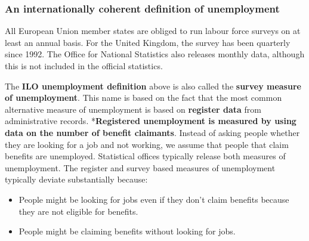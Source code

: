 \documentclass[
]{book}
\providecommand{\tightlist}{%
  \setlength{\itemsep}{0pt}\setlength{\parskip}{0pt}}
\begin{document}
\hypertarget{an-internationally-coherent-definition-of-unemployment}{%
\subsubsection*{An internationally coherent definition of unemployment}\label{an-internationally-coherent-definition-of-unemployment}}

All European Union member states are obliged to run labour force surveys on at least an annual basis. For the United Kingdom, the survey has been quarterly since 1992. The Office for National Statistics also releases monthly data, although this is not included in the official statistics.

The \textbf{ILO unemployment definition} above is also called the \textbf{survey measure of unemployment}. This name is based on the fact that the most common alternative measure of unemployment is based on \textbf{register data} from administrative records. *\textbf{Registered unemployment is measured by using data on the number of benefit claimants}. Instead of asking people whether they are looking for a job and not working, we assume that people that claim benefits are unemployed. Statistical offices typically release both measures of unemployment. The register and survey based measures of unemployment typically deviate substantially because:

\begin{itemize}
\tightlist
\item
  People might be looking for jobs even if they don't claim benefits because they are not eligible for benefits.
\item
  People might be claiming benefits without looking for jobs.
\end{itemize}
\end{document}
